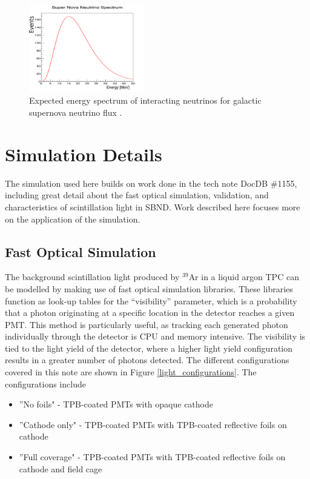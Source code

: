 \documentclass[a4paper]{article}
\begin{document}
\begin{figure}[H]
\center
\includegraphics[width=0.45\textwidth, height=0.4\textwidth]{sn_spectrum_larger.pdf}
\caption{Expected energy spectrum of interacting neutrinos for galactic supernova neutrino flux \cite{sn_spectrum}.}\label{sn_spectrum}
\end{figure}


\section{Simulation Details}\label{sim_detail}

The simulation used here builds on work done in the tech note DocDB \#1155, including great detail about the fast optical simulation, validation, and characteristics of scintillation light in SBND. Work described here focuses more on the application of the simulation.

\subsection{Fast Optical Simulation}
The background scintillation light produced by $^{39}$Ar in a liquid argon TPC can be modelled by making use of fast optical simulation libraries. These libraries function as look-up tables for the ``visibility'' parameter, which is a probability that a photon originating at a specific location in the detector reaches a given PMT. This method is particularly useful, as tracking each generated photon individually through the detector is CPU and memory intensive. The visibility is tied to the light yield of the detector, where a higher light yield configuration results in a greater number of photons detected. The different configurations covered in this note are shown in Figure \ref{light_configurations}. The configurations include
\begin{itemize}
	\item ''No foils" - TPB-coated PMTs with opaque cathode
	\item  ''Cathode only" - TPB-coated PMTs with TPB-coated reflective foils on cathode
	\item ''Full coverage" - TPB-coated PMTs with TPB-coated reflective foils on cathode and field cage
\end{itemize}
\end{document}

